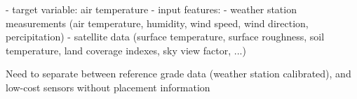- target variable: air temperature
- input features:
    - weather station measurements (air temperature, humidity, wind speed, wind direction, percipitation)
    - satellite data (surface temperature, surface roughness, soil temperature, land coverage indexes, sky view factor, ...)

    Need to separate between reference grade data (weather station calibrated), and low-cost sensors without placement information






